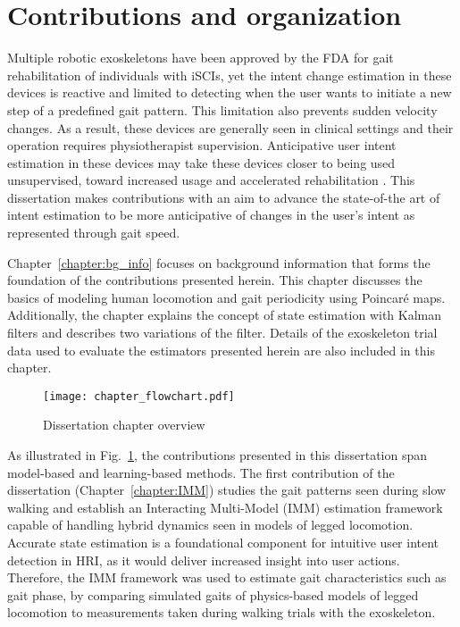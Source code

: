 \section{Contributions and organization}\label{sec:contribution}

Multiple robotic exoskeletons have been approved by the FDA for gait rehabilitation of individuals with iSCIs, yet the intent change estimation in these devices is reactive and limited to detecting when the user wants to initiate a new step of a predefined gait pattern. This limitation also prevents sudden velocity changes. As a result, these devices are generally seen in clinical settings and their operation requires physiotherapist supervision. Anticipative user intent estimation in these devices may take these devices closer to being used unsupervised, toward increased usage and accelerated rehabilitation \cite{hidler2011role}. This dissertation makes contributions with an aim to advance the state-of-the art of intent estimation to be more anticipative of changes in the user's intent as represented through gait speed.

Chapter~\ref{chapter:bg_info} focuses on background information that forms the foundation of the contributions presented herein. This chapter discusses the basics of modeling human locomotion and gait periodicity using Poincar\'e maps. Additionally, the chapter explains the concept of state estimation with Kalman filters and describes two variations of the filter. Details of the exoskeleton trial data used to evaluate the estimators presented herein are also included in this chapter.

\begin{figure}
	\centering
	\texttt{[image: chapter\_flowchart.pdf]}
	\caption{Dissertation chapter overview \label{fig:chapter_flowchart}}
\end{figure}

As illustrated in Fig.~\ref{fig:chapter_flowchart}, the contributions presented in this dissertation span model-based and learning-based methods. The first contribution of the dissertation (Chapter~\ref{chapter:IMM}) studies the gait patterns seen during slow walking and establish an Interacting Multi-Model (IMM) estimation framework capable of handling hybrid dynamics seen in models of legged locomotion. Accurate state estimation is a foundational component for intuitive user intent detection in HRI, as it would deliver increased insight into user actions. Therefore, the IMM framework was used to estimate gait characteristics such as gait phase, by comparing simulated gaits of physics-based models of legged locomotion to measurements taken during walking trials with the exoskeleton. 

